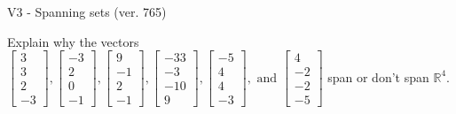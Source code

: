 \begin{exercise}
  \begin{exerciseTitle}V3 - Spanning sets (ver. 765)\end{exerciseTitle}
  \begin{exerciseStatement}
    Explain why the vectors \(\left[\begin{array}{r}
3 \\
3 \\
2 \\
-3
\end{array}\right] , \left[\begin{array}{r}
-3 \\
2 \\
0 \\
-1
\end{array}\right] , \left[\begin{array}{r}
9 \\
-1 \\
2 \\
-1
\end{array}\right] , \left[\begin{array}{r}
-33 \\
-3 \\
-10 \\
9
\end{array}\right] , \left[\begin{array}{r}
-5 \\
4 \\
4 \\
-3
\end{array}\right] , \text{ and } \left[\begin{array}{r}
4 \\
-2 \\
-2 \\
-5
\end{array}\right]\) span or don't span \(\mathbb{R}^4\). 
	



\end{exerciseStatement}
\end{exercise}
